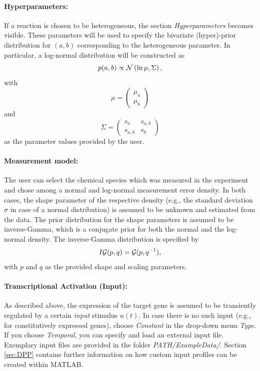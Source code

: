 \documentclass[a4paper, 9pt]{scrartcl}
\begin{document}
\paragraph{Hyperparameters:} If a reaction is chosen to be heterogeneous, the section \textit{Hyperparameters} becomes visible. These parameters will be used to specify the bivariate (hyper)-prior distribution for $(a, b)$ corresponding to the heterogeneous parameter. In particular, a log-normal distribution will be constructed as
\begin{equation}
	p(a, b) \propto \mathcal{N}\left( \ln \mu, \Sigma \right), \nonumber
\end{equation}
with $$\mu = \begin{pmatrix} \mu_{a} \\ \mu_{b} \end{pmatrix}$$ and $$\Sigma = \begin{pmatrix} s_{a} &s_{a, b} \\ s_{a, b} &s_{b}  \end{pmatrix}$$ as the parameter values provided by the user.

\paragraph{Measurement model:} The user can select the chemical species which was measured in the experiment and chose among a normal and log-normal measurement error density. In both cases, the shape parameter of the respective density (e.g., the standard deviation $\sigma$ in case of a normal distribution) is assumed to be unknown and estimated from the data. The prior distribution for the shape parameters is assumed to be inverse-Gamma, which is a conjugate prior for both the normal and the log-normal density. The inverse-Gamma distribution is specified by
\begin{equation}
	I\mathcal{G}(p, q) = \mathcal{G}(p, q^{-1}),
\end{equation}
with $p$ and $q$ as the provided shape and scaling parameters.


\paragraph{Transcriptional Activation (Input):} As described above, the expression of the target gene is assumed to be transiently regulated by a certain \textit{input} stimulus $u(t)$. In case there is no such input (e.g., for constitutively expressed genes), choose \textit{Constant} in the drop-down menu \textit{Type}. If you choose \textit{Temporal}, you can specify and load an external input file. Exemplary input files are provided in the folder \textit{PATH/ExampleData/}. Section \ref{sec:DPP} contains further information on how custom input profiles can be created within MATLAB.
\end{document}
